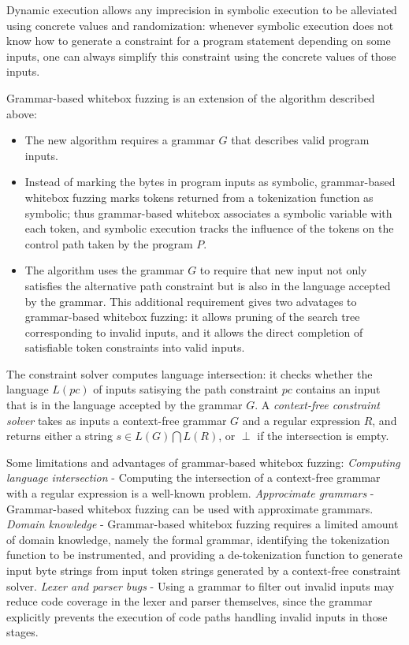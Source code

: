 Dynamic execution allows any imprecision in symbolic execution to be alleviated using concrete values and randomization: whenever symbolic execution does not know how to generate a constraint for a program statement depending on some inputs, one can always simplify this constraint using the concrete values of those inputs.

Grammar-based whitebox fuzzing is an extension of the algorithm described above:
\begin{itemize}
    \item The new algorithm requires a grammar $G$ that describes valid program inputs.
    \item Instead of marking the bytes in program inputs as symbolic, grammar-based whitebox fuzzing marks tokens returned from a tokenization function as symbolic; thus grammar-based whitebox associates a symbolic variable with each token, and symbolic execution tracks the influence of the tokens on the control path taken by the program $P$.
    \item The algorithm uses the grammar $G$ to require that new input not only satisfies the alternative path constraint but is also in the language accepted by the grammar.
    This additional requirement gives two advatages to grammar-based whitebox fuzzing: it allows pruning of the search tree corresponding to invalid inputs, and it allows the direct completion of satisfiable token constraints into valid inputs.
\end{itemize}

The constraint solver computes language intersection: it checks whether the language $L(pc)$ of inputs satisying the path constraint $pc$ contains an input that is in the language accepted by the grammar $G$.
A \textit{context-free constraint solver} takes as inputs a context-free grammar $G$ and a regular expression $R$, and returns either a string $s \in L(G) \bigcap L(R)$, or $\perp$ if the intersection is empty.

Some limitations and advantages of grammar-based whitebox fuzzing:
\textit{Computing language intersection} - Computing the intersection of a context-free grammar with a regular expression is a well-known problem.
\textit{Approcimate grammars} - Grammar-based whitebox fuzzing can be used with approximate grammars.
\textit{Domain knowledge} - Grammar-based whitebox fuzzing requires a limited amount of domain knowledge, namely the formal grammar, identifying the tokenization function to be instrumented, and providing a de-tokenization function to generate input byte strings from input token strings generated by a context-free constraint solver.
\textit{Lexer and parser bugs} - Using a grammar to filter out invalid inputs may reduce code coverage in the lexer and parser themselves, since the grammar explicitly prevents the execution of code paths handling invalid inputs in those stages.

